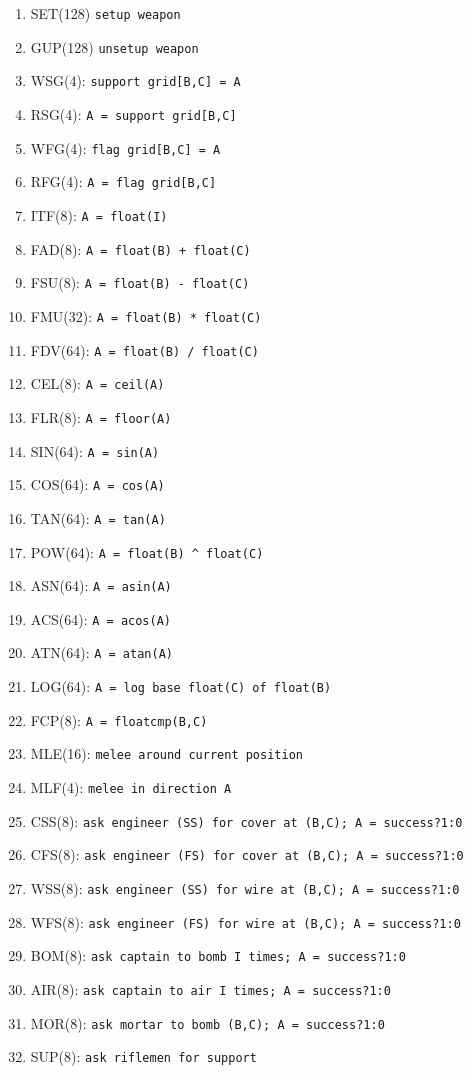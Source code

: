 \documentclass{article}
\begin{document}
\begin{enumerate}[noitemsep]
    \item SET(128) \texttt{setup weapon}
    \item GUP(128) \texttt{unsetup weapon}
    \item WSG(4): \texttt{support grid[B,C] = A}
    \item RSG(4): \texttt{A = support grid[B,C]}
    \item WFG(4): \texttt{flag grid[B,C] = A}
    \item RFG(4): \texttt{A = flag grid[B,C]}
    \item ITF(8): \texttt{A = float(I)}
    \item FAD(8): \texttt{A = float(B) + float(C)}
    \item FSU(8): \texttt{A = float(B) - float(C)}
    \item FMU(32): \texttt{A = float(B) * float(C)}
    \item FDV(64): \texttt{A = float(B) / float(C)}
    \item CEL(8): \texttt{A = ceil(A)}
    \item FLR(8): \texttt{A = floor(A)}
    \item SIN(64): \texttt{A = sin(A)}
    \item COS(64): \texttt{A = cos(A)}
    \item TAN(64): \texttt{A = tan(A)}
    \item POW(64): \texttt{A = float(B) \^{} float(C)}
    \item ASN(64): \texttt{A = asin(A)}
    \item ACS(64): \texttt{A = acos(A)}
    \item ATN(64): \texttt{A = atan(A)}
    \item LOG(64): \texttt{A = log base float(C) of float(B)}
    \item FCP(8): \texttt{A = floatcmp(B,C)}
    \item MLE(16): \texttt{melee around current position}
    \item MLF(4): \texttt{melee in direction A}
    \item CSS(8): \texttt{ask engineer (SS) for cover at (B,C); A = success?1:0}
    \item CFS(8): \texttt{ask engineer (FS) for cover at (B,C); A = success?1:0}
    \item WSS(8): \texttt{ask engineer (SS) for wire at (B,C); A = success?1:0}
    \item WFS(8): \texttt{ask engineer (FS) for wire at (B,C); A = success?1:0}
    \item BOM(8): \texttt{ask captain to bomb I times; A = success?1:0}
    \item AIR(8): \texttt{ask captain to air I times; A = success?1:0}
    \item MOR(8): \texttt{ask mortar to bomb (B,C); A = success?1:0}
    \item SUP(8): \texttt{ask riflemen for support}
\end{enumerate}
\end{document}
